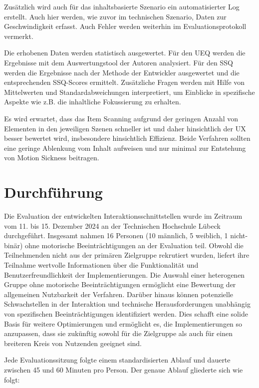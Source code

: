 Zusätzlich wird auch für das inhaltsbasierte Szenario ein automatisierter Log erstellt. Auch hier werden, wie zuvor im technischen Szenario, Daten zur Geschwindigkeit erfasst. Auch Fehler werden weiterhin im Evaluationsprotokoll vermerkt. 

Die erhobenen Daten werden statistisch ausgewertet. Für den UEQ werden die Ergebnisse mit dem Auswertungstool der Autoren analysiert. Für den SSQ werden die Ergebnisse nach der Methode der Entwickler ausgewertet und die entsprechenden SSQ-Scores ermittelt. Zusätzliche Fragen werden mit Hilfe von Mittelwerten und Standardabweichungen interpretiert, um Einblicke in spezifische Aspekte wie z.B. die inhaltliche Fokussierung zu erhalten.

Es wird erwartet, dass das Item Scanning aufgrund der geringen Anzahl von Elementen in den jeweiligen Szenen schneller ist und daher hinsichtlich der UX besser bewertet wird, insbesondere hinsichtlich Effizienz. Beide Verfahren sollten eine geringe Ablenkung vom Inhalt aufweisen und nur minimal zur Entstehung von Motion Sickness beitragen.

\section{Durchführung}

Die Evaluation der entwickelten Interaktionsschnittstellen wurde im Zeitraum vom 11. bis 15. Dezember 2024 an der Technischen Hochschule Lübeck durchgeführt. Insgesamt nahmen 16 Personen (10 männlich, 5 weiblich, 1 nicht-binär) ohne motorische Beeinträchtigungen an der Evaluation teil. Obwohl die Teilnehmenden nicht aus der primären Zielgruppe rekrutiert wurden, liefert ihre Teilnahme wertvolle Informationen über die Funktionalität und Benutzerfreundlichkeit der Implementierungen. Die Auswahl einer heterogenen Gruppe ohne motorische Beeinträchtigungen ermöglicht eine Bewertung der allgemeinen Nutzbarkeit der Verfahren. Darüber hinaus können potenzielle Schwachstellen in der Interaktion und technische Herausforderungen unabhängig von spezifischen Beeinträchtigungen identifiziert werden. Dies schafft eine solide Basis für weitere Optimierungen und ermöglicht es, die Implementierungen so anzupassen, dass sie zukünftig sowohl für die Zielgruppe als auch für einen breiteren Kreis von Nutzenden geeignet sind.

Jede Evaluationssitzung folgte einem standardisierten Ablauf und dauerte zwischen 45 und 60 Minuten pro Person. Der genaue Ablauf gliederte sich wie folgt:

